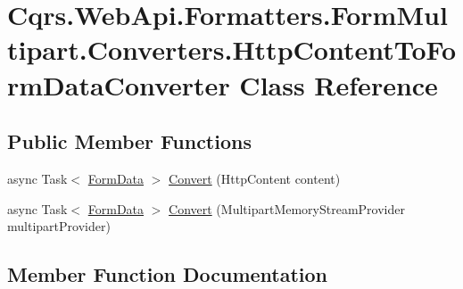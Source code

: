 \hypertarget{classCqrs_1_1WebApi_1_1Formatters_1_1FormMultipart_1_1Converters_1_1HttpContentToFormDataConverter}{}\section{Cqrs.\+Web\+Api.\+Formatters.\+Form\+Multipart.\+Converters.\+Http\+Content\+To\+Form\+Data\+Converter Class Reference}
\label{classCqrs_1_1WebApi_1_1Formatters_1_1FormMultipart_1_1Converters_1_1HttpContentToFormDataConverter}
\subsection*{Public Member Functions}
\begin{DoxyCompactItemize}
\item 
async Task$<$ \hyperlink{classCqrs_1_1WebApi_1_1Formatters_1_1FormMultipart_1_1Infrastructure_1_1FormData}{Form\+Data} $>$ \hyperlink{classCqrs_1_1WebApi_1_1Formatters_1_1FormMultipart_1_1Converters_1_1HttpContentToFormDataConverter_aea4d3dbab4e6f6892a6181a0911d4652_aea4d3dbab4e6f6892a6181a0911d4652}{Convert} (Http\+Content content)
\item 
async Task$<$ \hyperlink{classCqrs_1_1WebApi_1_1Formatters_1_1FormMultipart_1_1Infrastructure_1_1FormData}{Form\+Data} $>$ \hyperlink{classCqrs_1_1WebApi_1_1Formatters_1_1FormMultipart_1_1Converters_1_1HttpContentToFormDataConverter_ae6f522873d47a96df7b4616c7e2d6290_ae6f522873d47a96df7b4616c7e2d6290}{Convert} (Multipart\+Memory\+Stream\+Provider multipart\+Provider)
\end{DoxyCompactItemize}


\subsection{Member Function Documentation}
\mbox{\label{classCqrs_1_1WebApi_1_1Formatters_1_1FormMultipart_1_1Converters_1_1HttpContentToFormDataConverter_aea4d3dbab4e6f6892a6181a0911d4652_aea4d3dbab4e6f6892a6181a0911d4652}} 
